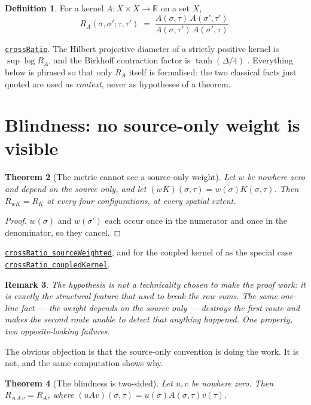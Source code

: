 \documentclass[11pt]{article}
\newtheorem{theorem}{Theorem}[section]
\newtheorem{remark}[theorem]{Remark}
\theoremstyle{definition}
\newtheorem{definition}[theorem]{Definition}
\newcommand{\anchor}{a70426f4c8a0ed733b4eee94fb01b158bc81fd08}
\newcommand{\osline}[3]{%
  \href{https://github.com/lluiseriksson/THE-ERIKSSON-PROGRAMME/blob/\anchor/YangMills/OS/#1.lean\#L#2}{\nolinkurl{#3}}}
\newcommand{\R}{\mathbb{R}}
\begin{document}
\begin{definition}\label{def:cr}
For a kernel $A:X\times X\to\R$ on a set $X$,
\[
  R_A(\sigma,\sigma';\tau,\tau') \;=\;
  \frac{A(\sigma,\tau)\,A(\sigma',\tau')}{A(\sigma,\tau')\,A(\sigma',\tau)} .
\]
\end{definition}

\osline{SpatialBirkhoff}{121}{crossRatio}.  The Hilbert projective diameter of
a strictly positive kernel is $\sup\log R_A$, and the Birkhoff contraction
factor is $\tanh(\Delta/4)$ \cite{Birkhoff,Bushell}.  Everything below is
phrased so that only $R_A$ itself is formalised: the two classical facts just
quoted are used as \emph{context}, never as hypotheses of a theorem.

\section{Blindness: no source-only weight is visible}

\begin{theorem}[The metric cannot see a source-only weight]\label{thm:blind}
Let $w$ be nowhere zero and depend on the source only, and let
$(wK)(\sigma,\tau) = w(\sigma)K(\sigma,\tau)$.  Then
$R_{wK} = R_{K}$ at every four configurations, at every spatial extent.
\end{theorem}

\begin{proof}
$w(\sigma)$ and $w(\sigma')$ each occur once in the numerator and once in the
denominator, so they cancel.
\end{proof}

\osline{SpatialBirkhoff}{136}{crossRatio\_sourceWeighted}, and for the
coupled kernel of \cite{ErikssonSpatial} as the special case
\osline{SpatialBirkhoff}{156}{crossRatio\_coupledKernel}.

\begin{remark}
The hypothesis is not a technicality chosen to make the proof work: it is
\emph{exactly} the structural feature that \cite{ErikssonSpatial} used to break
the row sums.  The same one-line fact --- the weight depends on the source only
--- destroys the first route and makes the second route unable to detect that
anything happened.  One property, two opposite-looking failures.
\end{remark}

The obvious objection is that the source-only convention is doing the work.  It
is not, and the same computation shows why.

\begin{theorem}[The blindness is two-sided]\label{thm:twosided}
Let $u,v$ be nowhere zero.  Then
$R_{\,u\,A\,v} = R_A$, where $(uAv)(\sigma,\tau)=u(\sigma)A(\sigma,\tau)v(\tau)$.
\end{theorem}
\end{document}
